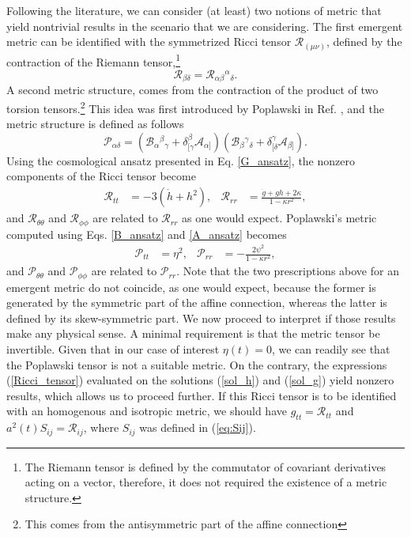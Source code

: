 \documentclass[epj]{svjour}
\providecommand{\Rie}[3]{\mathcal{R}_{#1}{}^{#2}{}_{#3}}
\providecommand{\B}[3]{\mathcal{B}_{#1}{}^{#2}{}_{#3}}
\providecommand{\A}[1]{\mathcal{A}_{#1}}
\providecommand{\Ri}[1]{\mathcal{R}_{#1}}
\begin{document}
Following the literature, we can consider (at least) two notions of metric that yield nontrivial results in the scenario that we are considering. The first emergent metric can be identified with the symmetrized Ricci tensor $\mathcal{R}_{(\mu\nu)}$, defined by the contraction of the Riemann tensor,\footnote{The Riemann tensor is defined by the commutator of covariant derivatives acting on a vector, therefore, it does not required the existence of a metric structure.}
\begin{equation}
    \label{chain}
    \Ri{\beta\delta} = \Rie{\alpha\beta}{\alpha}{\delta} .
\end{equation}
A second metric structure, comes from the contraction of the product of two torsion tensors.\footnote{This comes from the antisymmetric part of the affine connection} This idea was first introduced by Poplawski in Ref. \cite{Pop_awski_2013}, and the metric structure is defined as follows
\begin{equation}
    \mathcal{P}_{\alpha\delta} = \left(\B{\alpha}{\beta}{\gamma} + \delta^{\beta}_{[\gamma}\A{\alpha]}\right)\left(\B{\beta}{\gamma}{\delta} + \delta^{\gamma}_{[\delta}\A{\beta]}\right).
\end{equation}
Using the cosmological ansatz presented in Eq. \eqref{G_ansatz}, the nonzero components of the Ricci tensor become
\begin{align}
    \label{Ricci_tensor}
    \mathcal{R}_{tt} & = -3\left( \dot{h} + h^2\right), & \mathcal{R}_{rr} & = \frac{\dot{g} + gh + 2\kappa}{1 - \kappa r^2},
\end{align}
and $\mathcal{R}_{\theta\theta}$ and $\mathcal{R}_{\phi\phi}$ are related to $\mathcal{R}_{rr}$ as one would expect. Poplawski's metric computed using Eqs. \eqref{B_ansatz} and \eqref{A_ansatz} becomes
\begin{align}
    \label{Pop_tensor}
    \mathcal{P}_{tt} & = \eta^2, & \mathcal{P}_{rr} & = -\frac{2\psi^2}{1 - \kappa r^2},
\end{align}
and $\mathcal{P}_{\theta\theta}$ and $\mathcal{P}_{\phi\phi}$ are related to $\mathcal{P}_{rr}$. Note that the two prescriptions above for an emergent metric do not coincide, as one would expect, because the former is generated by the symmetric part of the affine connection, whereas the latter is defined by its skew-symmetric part. We now proceed to interpret if those results make any physical sense. A minimal requirement is that the metric tensor be invertible. Given that in our case of interest $\eta(t)=0$, we can readily see that the Poplawski tensor is not a suitable metric. On the contrary, the expressions (\ref{Ricci_tensor}) evaluated on the solutions (\ref{sol_h}) and (\ref{sol_g}) yield nonzero results, which allows us to proceed further. If this Ricci tensor is to be identified with an homogenous and isotropic metric, we should have $g_{tt} =  \mathcal{R}_{tt} $ and $a^2(t)S_{ij}=  \mathcal{R}_{ij}$, where $S_{ij}$ was defined in (\ref{eq:Sij}).
\end{document}
